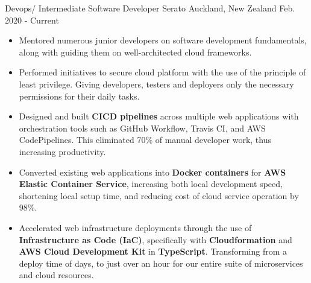 

\begin{cventries}

  \cventry
    {Devops/ Intermediate Software Developer} %
    {Serato} %
    {Auckland, New Zealand} %
    {Feb. 2020 - Current} %
    {\renewcommand{\labelitemii}{\bullet}
      \begin{cvitems} %
        \item[] {
            \begin{itemize}[leftmargin=14pt,topsep=5pt] %
                \itemsep0.3em
                \item {Mentored numerous junior developers on software development fundamentals, along with guiding them on well-architected cloud frameworks.}
                \item {Performed initiatives to secure cloud platform with the use of the principle of least privilege. Giving developers, testers and deployers only the necessary permissions for their daily tasks.}
                \item {Designed and built \textbf{CICD pipelines} across multiple web applications with orchestration tools such as GitHub Workflow, Travis CI, and AWS CodePipelines. This eliminated 70\% of manual developer work, thus increasing productivity.}
                \item {Converted existing web applications into \textbf{Docker containers} for \textbf{AWS Elastic Container Service}, increasing both local development speed, shortening local setup time, and reducing cost of cloud service operation by 98\%.}
                \item {Accelerated web infrastructure deployments through the use of \textbf{Infrastructure as Code (IaC)}, specifically with \textbf{Cloudformation} and \textbf{AWS Cloud Development Kit} in \textbf{TypeScript}. Transforming from a deploy time of days, to just over an hour for our entire suite of microservices and cloud resources. }

\end{itemize}}
\end{cvitems}}
\end{cventries}
